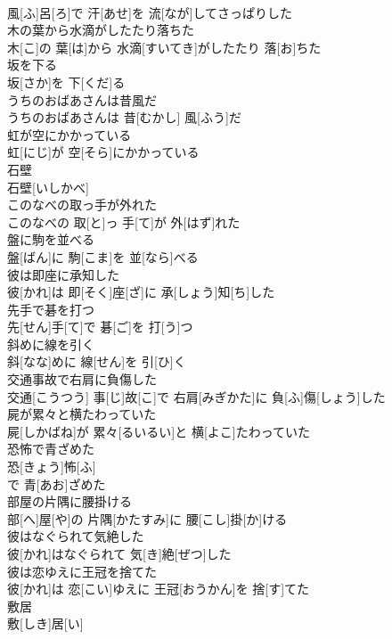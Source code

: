\documentclass[8pt]{extreport}
\begin{document}
\begin{CJK}{UTF8}{min}
\\	風[ふ]呂[ろ]で 汗[あせ]を 流[なが]してさっぱりした
\\	木の葉から水滴がしたたり落ちた	
\\	木[こ]の 葉[は]から 水滴[すいてき]がしたたり 落[お]ちた
\\	坂を下る	
\\	坂[さか]を 下[くだ]る
\\	うちのおばあさんは昔風だ	
\\	うちのおばあさんは 昔[むかし] 風[ふう]だ
\\	虹が空にかかっている	
\\	虹[にじ]が 空[そら]にかかっている
\\	石壁	
\\	石壁[いしかべ]
\\	このなべの取っ手が外れた	
\\	このなべの 取[と]っ 手[て]が 外[はず]れた
\\	盤に駒を並べる	
\\	盤[ばん]に 駒[こま]を 並[なら]べる
\\	彼は即座に承知した	
\\	彼[かれ]は 即[そく]座[ざ]に 承[しょう]知[ち]した
\\	先手で碁を打つ	
\\	先[せん]手[て]で 碁[ご]を 打[う]つ
\\	斜めに線を引く	
\\	斜[なな]めに 線[せん]を 引[ひ]く
\\	交通事故で右肩に負傷した	
\\	交通[こうつう] 事[じ]故[こ]で 右肩[みぎかた]に 負[ふ]傷[しょう]した
\\	屍が累々と横たわっていた	
\\	屍[しかばね]が 累々[るいるい]と 横[よこ]たわっていた
\\	恐怖で青ざめた	
\\	恐[きょう]怖[ふ]
\\	で 青[あお]ざめた 
\\	部屋の片隅に腰掛ける	
\\	部[へ]屋[や]の 片隅[かたすみ]に 腰[こし]掛[か]ける
\\	彼はなぐられて気絶した	
\\	彼[かれ]はなぐられて 気[き]絶[ぜつ]した
\\	彼は恋ゆえに王冠を捨てた	
\\	彼[かれ]は 恋[こい]ゆえに 王冠[おうかん]を 捨[す]てた
\\	敷居	
\\	敷[しき]居[い]

\end{CJK}
\end{document}
